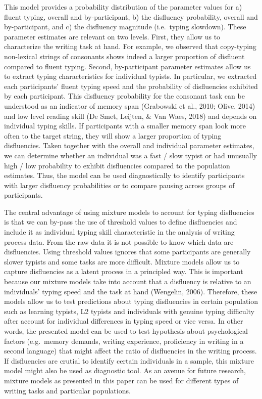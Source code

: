 \documentclass[english,man,floatsintext]{apa7}
\begin{document}
This model provides a probability distribution of the parameter values for a) fluent typing, overall and by-participant, b) the disfluency probability, overall and by-participant, and c) the disfluency magnitude (i.e.~typing slowdown). These parameter estimates are relevant on two levels. First, they allow us to characterize the writing task at hand. For example, we observed that copy-typing non-lexical strings of consonants shows indeed a larger proportion of disfluent compared to fluent typing. Second, by-participant parameter estimates allow us to extract typing characteristics for individual typists. In particular, we extracted each participants' fluent typing speed and the probability of disfluencies exhibited by each participant. This disfluency probability for the consonant task can be understood as an indicator of memory span (Grabowski et al., 2010; Olive, 2014) and low level reading skill (De Smet, Leijten, \& Van Waes, 2018) and depends on individual typing skills. If participants with a smaller memory span look more often to the target string, they will show a larger proportion of typing disfluencies. Taken together with the overall and individual parameter estimates, we can determine whether an individual was a fast / slow typist or had unusually high / low probability to exhibit disfluencies compared to the population estimates. Thus, the model can be used diagnostically to identify participants with larger disfluency probabilities or to compare pausing across groups of participants.

The central advantage of using mixture models to account for typing disfluencies is that we can by-pass the use of threshold values to define disfluencies and include it as individual typing skill characteristic in the analysis of writing process data. From the raw data it is not possible to know which data are disfluencies. Using threshold values ignores that some participants are generally slower typists and some tasks are more difficult. Mixture models allow us to capture disfluencies as a latent process in a principled way. This is important because our mixture models take into account that a disfluency is relative to an individuals' typing speed and the task at hand (Wengelin, 2006). Therefore, these models allow us to test predictions about typing disfluencies in certain population such as learning typists, L2 typists and individuals with genuine typing difficulty after account for individual differences in typing speed or vice versa. In other words, the presented model can be used to test hypothesis about psychological factors (e.g.~memory demands, writing experience, proficiency in writing in a second language) that might affect the ratio of disfluencies in the writing process. If disfluencies are crutial to identify certain individuals in a sample, this mixture model might also be used as diagnostic tool. As an avenue for future research, mixture models as presented in this paper can be used for different types of writing tasks and particular populations.
\end{document}
